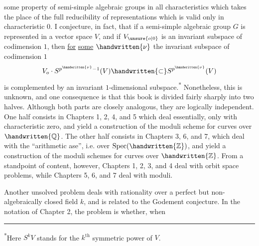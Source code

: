 
some property of semi-simple algebraic groups in all characteristics which takes the place of the full reducibility of representations which is valid only in characteristic $0$. I conjecture, in fact, that if a semi-simple algebraic group $G$ is represented in a vector space $V$, and if $V_{\unsure{o|0}}$ is an invariant subspace of codimension $1$, then \uline{for} \uline{some} \uline{$\handwritten{\nu}$} the invariant subspace of codimension $1$
\[
V_o\cdot S^{p^{\handwritten{\nu}}-1}(V)\handwritten{\subset}S^{p^{\handwritten{\nu}}}(V)
\]
is complemented by an invariant $1$-dimensional subspace.\textsuperscript{*} Nonetheless, this is unknown, and one consequence is that this book is divided fairly sharply into two halves. Although both parts are closely analogous, they are logically independent. One half consists in Chapters 1, 2, 4, and 5 which deal essentially, only with characteristic zero, and yield a construction of the moduli scheme for curves over $\handwritten{\mathbb Q}$. The other half consists in Chapters 3, 6, and 7, which deal with the ``arithmetic ase'', i.e. over $\operatorname{Spec}(\handwritten{\mathbb Z})$, and yield a construction of the moduli schemes for curves over $\handwritten{\mathbb Z}$. From a standpoint of content, however, Chapters 1, 2, 3, and 4 deal with orbit space problems, while Chapters 5, 6, and 7 deal with moduli.

Another unsolved problem deals with rationality over a perfect but non-algebraically closed field $k$, and is related to the Godement conjecture. In the notation of Chapter 2, the problem is whether, when

\noindent\rule{5em}{0.4pt}\par
\noindent\textsuperscript{*}Here $S^k V$ stands for the $k^{\mathrm{th}}$ symmetric power of $V$.
